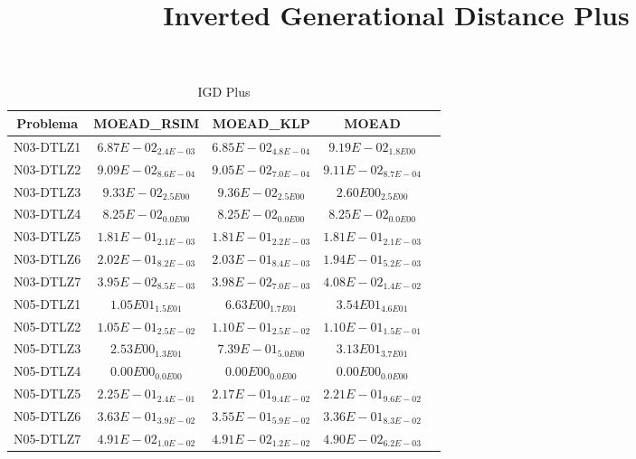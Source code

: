 \documentclass{article}
\title{Inverted Generational Distance Plus}
\author{}
\begin{document}
\maketitle
\begin{table*}[ht!]
\scriptsize
\caption{IGD Plus}
\centering\begin{tabular}{|c||c||c||c||c|} \hline
Problema &MOEAD_RSIM &MOEAD_KLP &MOEAD\\\hline
N03-DTLZ1 &\cellcolor{gray25}$6.87E-02_{2.4E-03}$ &\cellcolor{gray95}$6.85E-02_{4.8E-04}$ &$9.19E-02_{1.8E00}$\\ 
\hline
N03-DTLZ2 &\cellcolor{gray25}$9.09E-02_{8.6E-04}$ &\cellcolor{gray95}$9.05E-02_{7.0E-04}$ &$9.11E-02_{8.7E-04}$\\ 
\hline
N03-DTLZ3 &\cellcolor{gray95}$9.33E-02_{2.5E00}$ &\cellcolor{gray25}$9.36E-02_{2.5E00}$ &$2.60E00_{2.5E00}$\\ 
\hline
N03-DTLZ4 &\cellcolor{gray95}$8.25E-02_{0.0E00}$ &\cellcolor{gray25}$8.25E-02_{0.0E00}$ &$8.25E-02_{0.0E00}$\\ 
\hline
N03-DTLZ5 &\cellcolor{gray25}$1.81E-01_{2.1E-03}$ &\cellcolor{gray95}$1.81E-01_{2.2E-03}$ &$1.81E-01_{2.1E-03}$\\ 
\hline
N03-DTLZ6 &\cellcolor{gray25}$2.02E-01_{8.2E-03}$ &$2.03E-01_{8.4E-03}$ &\cellcolor{gray95}$1.94E-01_{5.2E-03}$\\ 
\hline
N03-DTLZ7 &\cellcolor{gray95}$3.95E-02_{8.5E-03}$ &\cellcolor{gray25}$3.98E-02_{7.0E-03}$ &$4.08E-02_{1.4E-02}$\\ 
\hline
N05-DTLZ1 &\cellcolor{gray25}$1.05E01_{1.5E01}$ &\cellcolor{gray95}$6.63E00_{1.7E01}$ &$3.54E01_{4.6E01}$\\ 
\hline
N05-DTLZ2 &\cellcolor{gray95}$1.05E-01_{2.5E-02}$ &\cellcolor{gray25}$1.10E-01_{2.5E-02}$ &$1.10E-01_{1.5E-01}$\\ 
\hline
N05-DTLZ3 &\cellcolor{gray25}$2.53E00_{1.3E01}$ &\cellcolor{gray95}$7.39E-01_{5.0E00}$ &$3.13E01_{3.7E01}$\\ 
\hline
N05-DTLZ4 &\cellcolor{gray95}$0.00E00_{0.0E00}$ &\cellcolor{gray25}$0.00E00_{0.0E00}$ &$0.00E00_{0.0E00}$\\ 
\hline
N05-DTLZ5 &$2.25E-01_{2.4E-01}$ &\cellcolor{gray95}$2.17E-01_{9.4E-02}$ &\cellcolor{gray25}$2.21E-01_{9.6E-02}$\\ 
\hline
N05-DTLZ6 &$3.63E-01_{3.9E-02}$ &\cellcolor{gray25}$3.55E-01_{5.9E-02}$ &\cellcolor{gray95}$3.36E-01_{8.3E-02}$\\ 
\hline
N05-DTLZ7 &$4.91E-02_{1.0E-02}$ &\cellcolor{gray25}$4.91E-02_{1.2E-02}$ &\cellcolor{gray95}$4.90E-02_{6.2E-03}$\\ 

\end{tabular}
\end{table*}
\end{document}
